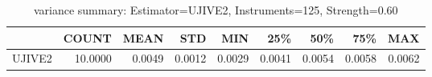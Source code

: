 \begin{table}[ht]
\centering
\caption{variance summary: Estimator=UJIVE2, Instruments=125, Strength=0.60}
\begin{tabular}{lrrrrrrrr}
\toprule
 & COUNT & MEAN & STD & MIN & 25\% & 50\% & 75\% & MAX \\
\midrule
UJIVE2 & 10.0000 & 0.0049 & 0.0012 & 0.0029 & 0.0041 & 0.0054 & 0.0058 & 0.0062 \\
\bottomrule
\end{tabular}
\end{table}
